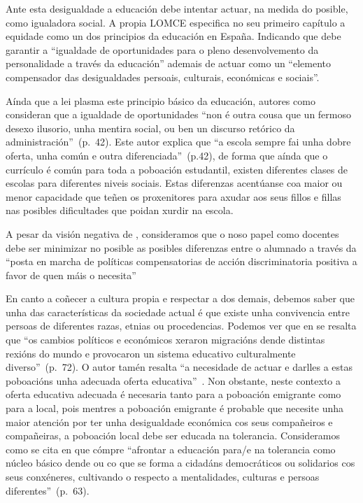 Ante esta desigualdade a educación debe intentar actuar, na medida do posible, como igualadora social. A propia LOMCE especifica no seu primeiro capítulo a equidade como un dos principios da educación en España. Indicando que debe garantir a ``igualdade de oportunidades para o pleno desenvolvemento da personalidade a través da educación'' ademais de actuar como un ``elemento compensador das desigualdades persoais, culturais, económicas e sociais''.

Aínda que a lei plasma este principio básico da educación, autores como  consideran que a igualdade de oportunidades ``non é outra cousa que un fermoso desexo ilusorio, unha mentira social, ou ben un discurso retórico da administración''~(p.~42). Este autor explica que ``a escola sempre fai unha dobre oferta, unha común e outra diferenciada''~(p.42), de forma que aínda que o currículo é común para toda a poboación estudantil, existen diferentes clases de escolas para diferentes niveis sociais. Estas diferenzas acentúanse coa maior ou menor capacidade que teñen os proxenitores para axudar aos seus fillos e fillas nas posibles dificultades que poidan xurdir na escola.

A pesar da visión negativa de \citeauthor{funcionessocieles}, consideramos que o noso papel como docentes debe ser minimizar no posible as posibles diferenzas entre o alumnado a través da ``posta en marcha de políticas compensatorias de acción discriminatoria positiva a favor de quen máis o necesita''~\cite[p.~17]{sacristan2000educacion}

En canto a coñecer a cultura propia e respectar a dos demais, debemos saber que unha das características da sociedade actual é que existe unha convivencia entre persoas de diferentes razas, etnias ou procedencias. Podemos ver que en  se resalta que ``os cambios políticos e económicos xeraron migracións dende distintas rexións do mundo e provocaron un sistema educativo culturalmente diverso''~(p.~72). O autor tamén resalta ``a necesidade de actuar e darlles a estas poboacións unha adecuada oferta educativa''~\cite[p.~72]{rivera2014practica}. Non obstante, neste contexto a oferta educativa adecuada é necesaria tanto para a poboación emigrante como para a local, pois mentres a poboación emigrante é probable que necesite unha maior atención por ter unha desigualdade económica cos seus compañeiros e compañeiras, a poboación local debe ser educada na tolerancia. Consideramos como se cita en   que cómpre ``afrontar a educación para/e na tolerancia como núcleo básico dende ou co que se forma a cidadáns democráticos ou solidarios cos seus conxéneres, cultivando o respecto a mentalidades, culturas e persoas diferentes''~(p.~63).

